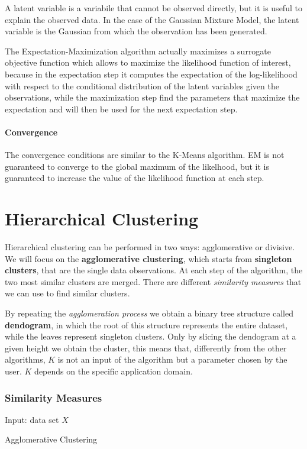 A latent variable is a variabile that cannot be observed directly, but it is useful to explain the observed data. In the case of the Gaussian Mixture Model, the latent variable is the Gaussian from which the observation has been generated.

The Expectation-Maximization algorithm actually maximizes a surrogate objective function which allows to maximize the likelihood function of interest, because in the expectation step it computes the expectation of the log-likelihood with respect to the conditional distribution of the latent variables given the observations, while the maximization step find the parameters that maximize the expectation and will then be used for the next expectation step.

\paragraph*{Convergence}
The convergence conditions are similar to the K-Means algorithm. EM is not guaranteed to converge to the global maximum of the likelhood, but it is guaranteed to increase the value of the likelihood function at each step.

\section{Hierarchical Clustering}
Hierarchical clustering can be performed in two ways: agglomerative or divisive.
We will focus on the \textbf{agglomerative clustering}, which starts from \textbf{singleton clusters}, that are the single data observations. At each step of the algorithm, the two most similar clusters are merged. There are different \textit{similarity measures} that we can use to find similar clusters.

By repeating the \textit{agglomeration process} we obtain a binary tree structure called \textbf{dendogram}, in which the root of this structure represents the entire dataset, while the leaves represent singleton clusters. Only by slicing the dendogram at a given height we obtain the cluster, this means that, differently from the other algorithms, $K$ is not an input of the algorithm but a parameter chosen by the user. $K$ depends on the specific application domain.

\subsubsection{Similarity Measures}

\begin{algorithm}
    \SetAlgoLined
    Input: data set $X$ \\
    \caption{Agglomerative Clustering}
\end{algorithm}

